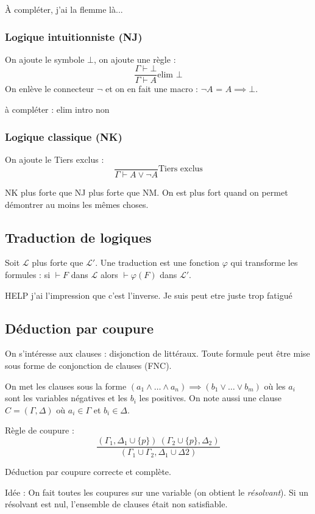 \documentclass[french]{article}
\begin{document}
À compléter, j'ai la flemme là...

\subsubsection{Logique intuitionniste (NJ)}
On ajoute le symbole $\bot$, on ajoute une règle :
$$\frac{\Gamma\vdash\bot}{\Gamma\vdash A}\text{elim $\bot$}$$
On enlève le connecteur $\neg$ et on en fait une macro : $\neg A$ = $A\implies\bot$.

à compléter : elim intro non

\subsubsection{Logique classique (NK)}
On ajoute le Tiers exclus :
$$\frac{}{\Gamma\vdash A\vee\neg A}\text{Tiers exclus}$$

NK plus forte que NJ plus forte que NM. On est plus fort quand on permet démontrer au moins les mêmes choses.
 
\subsection{Traduction de logiques}
Soit $\mathcal{L}$ plus forte que $\mathcal{L}'$. Une traduction est une fonction $\varphi$ qui transforme les formules : si $\vdash F$ dans $\mathcal{L}$ alors $\vdash\varphi (F)$ dans $\mathcal{L}'$. 

HELP j'ai l'impression que c'est l'inverse. Je suis peut etre juste trop fatigué

\subsection{Déduction par coupure}
On s'intéresse aux clauses : disjonction de littéraux. Toute formule peut être mise sous forme de conjonction de clauses (FNC).

On met les clauses sous la forme $(a_1\wedge\dots\wedge a_n)\implies (b_1\vee\dots\vee b_m)$ où les $a_i$ sont les variables négatives et les $b_i$ les positives. On note aussi une clause $C=(\Gamma,\Delta)$ où $a_i\in\Gamma$ et $b_i\in\Delta$.

Règle de coupure :
$$\frac{(\Gamma_1,\Delta_1\cup\{p\})\ (\Gamma_2\cup\{p\}, \Delta_2)}{(\Gamma_1\cup\Gamma_2, \Delta_1\cup\Delta2)}$$

Déduction par coupure correcte et complète.

Idée : On fait toutes les coupures sur une variable (on obtient le \emph{résolvant}). Si un résolvant est nul, l'ensemble de clauses était non satisfiable.
\end{document}
